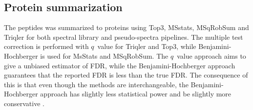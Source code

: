\documentclass[10pt,letterpaper]{article}
\begin{document}
\subsection*{Protein summarization}
The peptides was summarized to proteins using Top3, MSstats, MSqRobSum and Triqler for both spectral library and pseudo-spectra pipelines. The multiple test correction is performed with $q$~value for Triqler and Top3, while Benjamini-Hochberger \cite{benjamini1995controlling} is used for MsStats and MSqRobSum. The $q$~value approach aims to give a unbiased estimator of FDR, while the Benjamini-Hochberger approach guarantees that the reported FDR is less than the true FDR. The consequence of this is that even though the methods are interchangeable, the Benjamini-Hochberger approach has slightly less statistical power and be slightly more conservative \cite{korthauer2019practical}.

\end{document}
